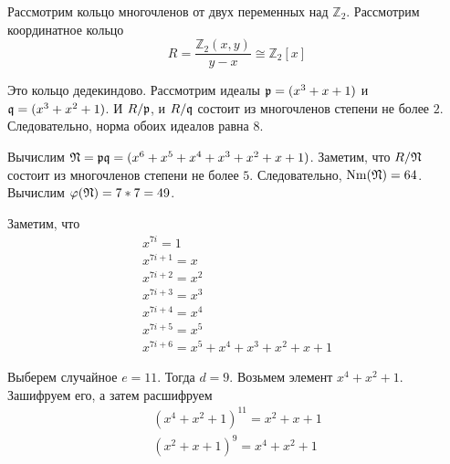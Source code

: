 \documentclass[_00_autoref.tex]{subfiles}
\begin{document}
\begin{example}
	Рассмотрим кольцо многочленов от двух переменных над $\mathbb{Z}_2$.
	Рассмотрим координатное кольцо
	\begin{equation*}
		R = \frac{\mathbb{Z}_2(x, y)}{y-x} \cong \mathbb{Z}_2[x]
	\end{equation*}
	
	Это кольцо дедекиндово.
	Рассмотрим идеалы $\mathfrak{p} = (x^3 + x + 1)$ и $\mathfrak{q} = (x^3 + x^2 + 1)$.
	И $R/\mathfrak{p}$, и $R/\mathfrak{q}$ состоит из многочленов степени не более $2$.
	Следовательно, норма обоих идеалов равна $8$.
	
	Вычислим $\mathfrak{N} = \mathfrak{p}\mathfrak{q} = (x^6 + x^5 + x^4 + x^3 + x^2 + x + 1)$.
	Заметим, что $R/\mathfrak{N}$ состоит из многочленов степени не более $5$.
	Следовательно, $\textrm{Nm}(\mathfrak{N}) = 64$.
	Вычислим $\varphi(\mathfrak{N}) = 7 * 7 = 49$.

	Заметим, что
	\begin{equation*}
		\begin{array}{l}
			x^{7i} = 1\\
			x^{7i+1} = x\\
			x^{7i+2} = x^2\\
			x^{7i+3} = x^3\\
			x^{7i+4} = x^4\\
			x^{7i+5} = x^5\\
			x^{7i+6} = x^5 + x^4 + x^3 + x^2 + x + 1
		\end{array}
	\end{equation*}

	Выберем случайное $e = 11$.
	Тогда $d = 9$.
	Возьмем элемент $x^4 + x^2 + 1$.
	Зашифруем его, а затем расшифруем
	\begin{equation*}
	    \begin{split}
    		(x^4 + x^2 + 1)^{11} = x^2 + x + 1\\
    		(x^2 + x + 1)^{9} = x^4 + x^2 + 1
	    \end{split}
	\end{equation*}
\end{example}
\end{document}
